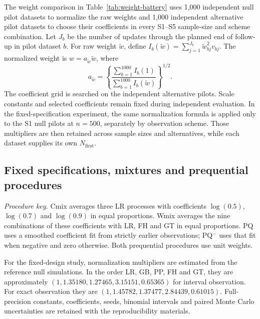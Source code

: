 \documentclass[12pt]{article}
\theoremstyle{definition}
\theoremstyle{remark}
\begin{document}
The weight comparison in Table~\ref{tab:weight-battery} uses 1,000 independent null pilot datasets to normalize the raw weights and 1,000 independent alternative pilot datasets to choose their coefficients in every S1--S5 sample-size and scheme combination. Let $J_b$ be the number of updates through the planned end of follow-up in pilot dataset $b$. For raw weight $\widetilde w$, define $I_b(\widetilde w)=\sum_{j=1}^{J_b}\widetilde w_{bj}^2v_{bj}$. The normalized weight is $w=a_{\widetilde w}\widetilde w$, where
\[a_{\widetilde w}=\left\{\frac{\sum_{b=1}^{1000}I_b(1)}{\sum_{b=1}^{1000}I_b(\widetilde w)}\right\}^{1/2}.\]
The coefficient grid is searched on the independent alternative pilots. Scale constants and selected coefficients remain fixed during independent evaluation. In the fixed-specification experiment, the same normalization formula is applied only to the S1 null pilots at $n=500$, separately by observation scheme. Those multipliers are then retained across sample sizes and alternatives, while each dataset supplies its own $N_{\mathrm{first}}$.
\subsection{Fixed specifications, mixtures and prequential procedures}
\label{sec:app-fixed-design}
\emph{Procedure key.} Cmix averages three LR processes with coefficients $\log(0.5)$, $\log(0.7)$ and $\log(0.9)$ in equal proportions. Wmix averages the nine combinations of these coefficients with LR, FH and GT in equal proportions. PQ uses a smoothed coefficient fit from strictly earlier observations; PQ$^-$ uses that fit when negative and zero otherwise. Both prequential procedures use unit weights.

For the fixed-design study, normalization multipliers are estimated from the reference null simulations. In the order LR, GB, PP, FH and GT, they are approximately $(1,1.35180,1.27465,3.15151,0.65365)$ for interval observation. For exact observation they are $(1,1.45782,1.37477,2.84439,0.61015)$. Full-precision constants, coefficients, seeds, binomial intervals and paired Monte Carlo uncertainties are retained with the reproducibility materials.
\end{document}
